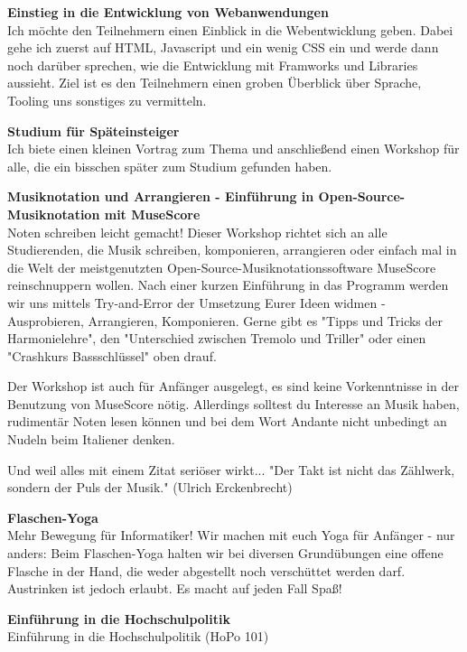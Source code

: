 {\textbf{Einstieg in die Entwicklung von Webanwendungen}\\
Ich möchte den Teilnehmern einen Einblick in die Webentwicklung geben. Dabei gehe ich zuerst auf HTML, Javascript und ein wenig CSS ein und werde dann noch darüber sprechen, wie die Entwicklung mit Framworks und Libraries aussieht. Ziel ist es den Teilnehmern einen groben Überblick über Sprache, Tooling uns sonstiges zu vermitteln.

\textbf{Studium für Späteinsteiger}\\
Ich biete einen kleinen Vortrag zum Thema und anschließend einen Workshop für alle, die ein bisschen später zum Studium gefunden haben.

\textbf{Musiknotation und Arrangieren - Einführung in Open-Source-Musiknotation mit MuseScore}\\
Noten schreiben leicht gemacht! Dieser Workshop richtet sich an alle Studierenden, die Musik schreiben, komponieren, arrangieren oder einfach mal in die Welt der meistgenutzten Open-Source-Musiknotationssoftware MuseScore reinschnuppern wollen. Nach einer kurzen Einführung in das Programm werden wir uns mittels Try-and-Error der Umsetzung Eurer Ideen widmen - Ausprobieren, Arrangieren, Komponieren. Gerne gibt es "Tipps und Tricks der Harmonielehre", den "Unterschied zwischen Tremolo und Triller" oder einen "Crashkurs Bassschlüssel" oben drauf.

Der Workshop ist auch für Anfänger ausgelegt, es sind keine Vorkenntnisse in der Benutzung von MuseScore nötig. Allerdings solltest du Interesse an Musik haben, rudimentär Noten lesen können und bei dem Wort Andante nicht unbedingt an Nudeln beim Italiener denken.

Und weil alles mit einem Zitat seriöser wirkt... "Der Takt ist nicht das Zählwerk, sondern der Puls der Musik." (Ulrich Erckenbrecht)

\textbf{Flaschen-Yoga}\\
Mehr Bewegung für Informatiker! Wir machen mit euch Yoga für Anfänger - nur anders: Beim Flaschen-Yoga halten wir bei diversen Grundübungen eine offene Flasche in der Hand, die weder abgestellt noch verschüttet werden darf. Austrinken ist jedoch erlaubt. Es macht auf jeden Fall Spaß!



\textbf{Einführung in die Hochschulpolitik}\\
Einführung in die Hochschulpolitik (HoPo 101)

}

